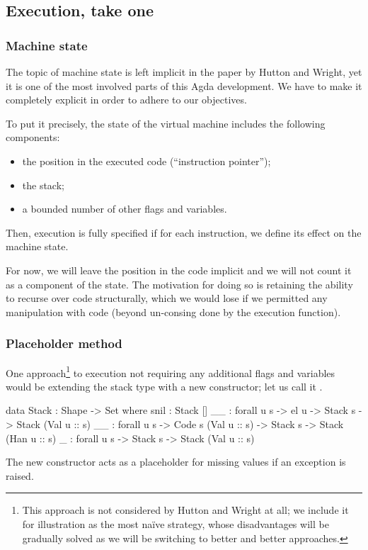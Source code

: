 \subsection{Execution, take one}

\subsubsection{Machine state}

The topic of machine state is left implicit in the paper by Hutton and Wright,
yet it is one of the most involved parts of this Agda development. We have to
make it completely explicit in order to adhere to our objectives.

To put it precisely, the state of the virtual machine includes
the following components:
\begin{itemize}
	\item the position in the executed code (``instruction pointer'');
	\item the stack;
	\item a bounded number of other flags and variables.
\end{itemize}

Then, execution is fully specified if for each instruction, we define its
effect on the machine state.

For now, we will leave the position in the code implicit and we will not count
it as a component of the state. The motivation for doing so is retaining
the ability to recurse over code structurally, which we would lose if we
permitted any manipulation with code (beyond un-consing done by the execution
function).

\subsubsection{Placeholder method}

One approach\footnote{This approach is not considered by Hutton and Wright at all;
we include it for illustration as the most na\"{i}ve strategy, whose disadvantages
will be gradually solved as we will be switching to better and better approaches.}
to execution not requiring any additional flags and variables
would be extending the stack type with a new constructor; let us call it
\ident{\void\scons\!\!\_}.
\begin{code}
  data Stack : Shape -> Set where
    snil : Stack []
    _\scons\_ : forall {u s} -> el u -> Stack s -> Stack (Val u :: s)
    _\sconsh\_ : forall {u s} -> Code s (Val u :: s) -> Stack s -> Stack (Han u :: s)
    \void\scons\_ : forall {u s} -> Stack s -> Stack (Val u :: s)
\end{code}
The new constructor acts as a placeholder for missing values if an exception is raised.

